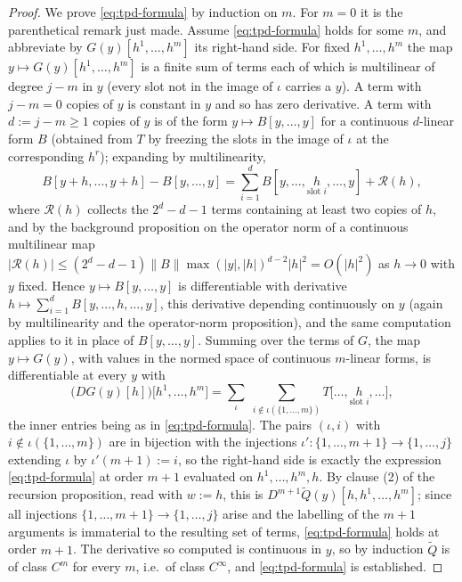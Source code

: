 \begin{proof}
We prove \eqref{eq:tpd-formula} by induction on $m$.  For $m=0$ it is the parenthetical remark
just made.  Assume \eqref{eq:tpd-formula} holds for some $m$, and abbreviate by
$G(y)[h^{1},\ldots,h^{m}]$ its right-hand side.  For fixed $h^{1},\ldots,h^{m}$ the map
$y\mapsto G(y)[h^{1},\ldots,h^{m}]$ is a finite sum of terms each of which is multilinear of
degree $j-m$ in $y$ (every slot not in the image of $\iota$ carries a $y$).  A term with
$j-m=0$ copies of $y$ is constant in $y$ and so has zero derivative.  A term with $d:=j-m\ge1$
copies of $y$ is of the form $y\mapsto B[y,\ldots,y]$ for a continuous $d$-linear form $B$
(obtained from $T$ by freezing the slots in the image of $\iota$ at the corresponding
$h^{r}$); expanding by multilinearity,
\[
  B[y+h,\ldots,y+h]-B[y,\ldots,y]
  =\sum_{i=1}^{d}B[y,\ldots,\underset{\text{slot }i}{h},\ldots,y]+\mathcal{R}(h),
\]
where $\mathcal{R}(h)$ collects the $2^{d}-d-1$ terms containing at least two copies of $h$,
and by the background proposition on the operator norm of a continuous multilinear map
$\lvert\mathcal{R}(h)\rvert\le(2^{d}-d-1)\lVert B\rVert\max(\lvert y\rvert,\lvert
h\rvert)^{d-2}\lvert h\rvert^{2}=O(\lvert h\rvert^{2})$ as $h\to0$ with $y$ fixed.  Hence
$y\mapsto B[y,\ldots,y]$ is differentiable with derivative
$h\mapsto\sum_{i=1}^{d}B[y,\ldots,h,\ldots,y]$, this derivative depending continuously on $y$
(again by multilinearity and the operator-norm proposition), and the same computation applies
to it in place of $B[y,\ldots,y]$.  Summing over the terms of $G$, the map $y\mapsto G(y)$,
with values in the normed space of continuous $m$-linear forms, is differentiable at every $y$
with
\[
  \bigl(DG(y)[h]\bigr)\bigl[h^{1},\ldots,h^{m}\bigr]
  =\sum_{\iota}\;\sum_{i\notin\iota(\{1,\ldots,m\})}T\bigl[\ldots,\underset{\text{slot
  }i}{h},\ldots\bigr],
\]
the inner entries being as in \eqref{eq:tpd-formula}.  The pairs $(\iota,i)$ with
$i\notin\iota(\{1,\ldots,m\})$ are in bijection with the injections
$\iota'\colon\{1,\ldots,m+1\}\to\{1,\ldots,j\}$ extending $\iota$ by $\iota'(m+1):=i$, so the
right-hand side is exactly the expression \eqref{eq:tpd-formula} at order $m+1$ evaluated on
$h^{1},\ldots,h^{m},h$.  By clause (2) of the recursion proposition, read with $w:=h$, this is
$D^{m+1}\widetilde{Q}(y)[h,h^{1},\ldots,h^{m}]$; since all injections
$\{1,\ldots,m+1\}\to\{1,\ldots,j\}$ arise and the labelling of the $m+1$ arguments is
immaterial to the resulting set of terms, \eqref{eq:tpd-formula} holds at order $m+1$.  The
derivative so computed is continuous in $y$, so by induction $\widetilde{Q}$ is of class
$C^{m}$ for every $m$, i.e.\ of class $C^{\infty}$, and \eqref{eq:tpd-formula} is established.


\end{proof}
